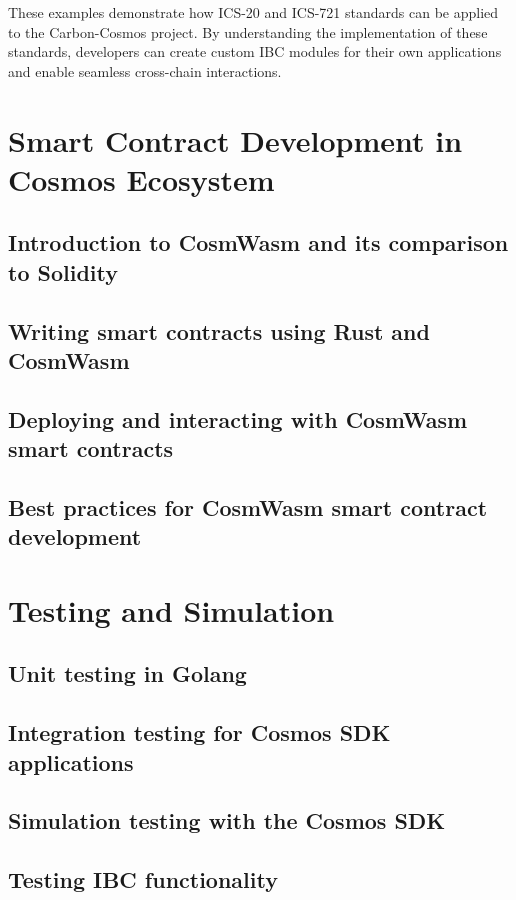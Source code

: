 \documentclass{article}
\begin{document}
These examples demonstrate how ICS-20 and ICS-721 standards can be applied to the Carbon-Cosmos project. By understanding the implementation of these standards, developers can create custom IBC modules for their own applications and enable seamless cross-chain interactions.




\section{Smart Contract Development in Cosmos Ecosystem}

\subsection{Introduction to CosmWasm and its comparison to Solidity}
\subsection{Writing smart contracts using Rust and CosmWasm}
\subsection{Deploying and interacting with CosmWasm smart contracts}
\subsection{Best practices for CosmWasm smart contract development}

\section{Testing and Simulation}

\subsection{Unit testing in Golang}
\subsection{Integration testing for Cosmos SDK applications}
\subsection{Simulation testing with the Cosmos SDK}
\subsection{Testing IBC functionality}
\end{document}
